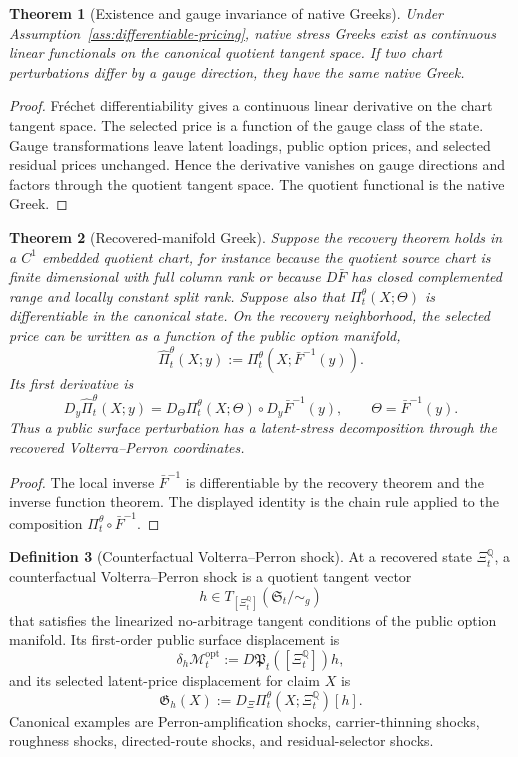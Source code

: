 \documentclass[11pt,a4paper]{amsart}
\theoremstyle{plain}
\newtheorem{theorem}{Theorem}[section]
\theoremstyle{definition}
\newtheorem{definition}[theorem]{Definition}
\theoremstyle{remark}
\newcommand{\QQ}{\mathbb{Q}}
\newcommand{\cM}{\mathcal{M}}
\begin{document}
\begin{theorem}[Existence and gauge invariance of native Greeks]\label{thm:native-greeks}
Under Assumption~\ref{ass:differentiable-pricing}, native stress Greeks exist as continuous linear
functionals on the canonical quotient tangent space.  If two chart perturbations differ by a gauge
direction, they have the same native Greek.
\end{theorem}

\begin{proof}
Fr\'echet differentiability gives a continuous linear derivative on the chart tangent space.  The
selected price is a function of the gauge class of the state.  Gauge transformations leave latent
loadings, public option prices, and selected residual prices unchanged.  Hence the derivative
vanishes on gauge directions and factors through the quotient tangent space.  The quotient
functional is the native Greek.
\end{proof}

\begin{theorem}[Recovered-manifold Greek]\label{thm:recovered-manifold-greek}
Suppose the recovery theorem holds in a \(C^1\) embedded quotient chart, for instance because the
quotient source chart is finite dimensional with full column rank or because
\(D\bar F\) has closed complemented range and locally constant split rank.  Suppose also that
\(\Pi_t^\theta(X;\Theta)\) is differentiable in the canonical state.  On the recovery
neighborhood, the selected price can be written as a function of the public option manifold,
\[
        \widehat\Pi_t^\theta(X;y)
        :=
        \Pi_t^\theta\!\left(X;\bar F^{-1}(y)\right).
\]
Its first derivative is
\[
        D_y\widehat\Pi_t^\theta(X;y)
        =
        D_\Theta\Pi_t^\theta(X;\Theta)\circ D_y\bar F^{-1}(y),
        \qquad \Theta=\bar F^{-1}(y).
\]
Thus a public surface perturbation has a latent-stress decomposition through the recovered
Volterra--Perron coordinates.
\end{theorem}

\begin{proof}
The local inverse \(\bar F^{-1}\) is differentiable by the recovery theorem and the inverse
function theorem.  The displayed identity is the chain rule applied to the composition
\(\Pi_t^\theta\circ\bar F^{-1}\).
\end{proof}

\begin{definition}[Counterfactual Volterra--Perron shock]\label{def:counterfactual-vp-shock}
At a recovered state \(\Xi_t^\QQ\), a counterfactual Volterra--Perron shock is a
quotient tangent vector
\[
        h\in T_{[\Xi_t^\QQ]}(\mathfrak S_t/\!\sim_g)
\]
that satisfies the linearized no-arbitrage tangent conditions of the public option manifold.  Its
first-order public surface displacement is
\[
        \delta_h\cM_t^{\mathrm{opt}}
        :=
        D\mathfrak P_t([\Xi_t^\QQ])h,
\]
and its selected latent-price displacement for claim \(X\) is
\[
        \mathfrak G_h(X)
        :=
        D_\Xi\Pi_t^\theta(X;\Xi_t^\QQ)[h].
\]
Canonical examples are Perron-amplification shocks, carrier-thinning shocks, roughness shocks,
directed-route shocks, and residual-selector shocks.
\end{definition}
\end{document}
